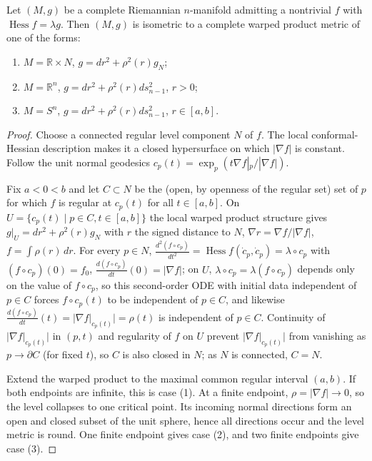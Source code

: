 \begin{theorem}
  \label{thm:pet-ch5-tashiro}

  Let $(M,g)$ be a complete Riemannian $n$-manifold admitting a nontrivial $f$
  with $\operatorname{Hess}f=\lambda g$. Then $(M,g)$ is isometric to a complete
  warped product metric of one of the forms:
  \begin{enumerate}
  \item[(1)] $M=\mathbb R\times N$, $g=dr^2+\rho^2(r)g_N$;
  \item[(2)] $M=\mathbb R^n$, $g=dr^2+\rho^2(r)ds_{n-1}^2$, $r>0$;
  \item[(3)] $M=S^n$, $g=dr^2+\rho^2(r)ds_{n-1}^2$, $r\in[a,b]$.
  \end{enumerate}
\end{theorem}
\begin{proof}
  \sketch
  Choose a connected regular level component $N$ of $f$.  The local
  conformal-Hessian description makes it a closed hypersurface on which
  $|\nabla f|$ is constant.  Follow the unit normal geodesics
  $c_p(t)=\exp_p(t\nabla f|_p/|\nabla f|)$.

  Fix $a<0<b$ and let $C\subset N$ be the (open, by openness of the regular set) set
  of $p$ for which $f$ is regular at $c_p(t)$ for all $t\in[a,b]$. On
  $U=\{c_p(t)\mid p\in C,t\in[a,b]\}$ the local warped product structure gives
  $g|_U=dr^2+\rho^2(r)g_N$ with $r$ the signed distance to $N$,
  $\nabla r=\nabla f/|\nabla f|$, $f=\int\rho(r)\,dr$. For every $p\in N$,
  $\frac{d^2(f\circ c_p)}{dt^2}=\operatorname{Hess}f(\dot c_p,\dot c_p)=\lambda\circ c_p$
  with $(f\circ c_p)(0)=f_0$, $\frac{d(f\circ c_p)}{dt}(0)=|\nabla f|$; on $U$,
  $\lambda\circ c_p=\lambda(f\circ c_p)$ depends only on the value of
  $f\circ c_p$, so this second-order ODE with initial data independent of
  $p\in C$ forces $f\circ c_p(t)$ to be independent of $p\in C$, and likewise
  $\frac{d(f\circ c_p)}{dt}(t)=|\nabla f|_{c_p(t)}|=\rho(t)$ is independent of
  $p\in C$. Continuity of $|\nabla f|_{c_p(t)}|$ in $(p,t)$ and regularity of $f$
  on $U$ prevent $|\nabla f|_{c_p(t)}|$ from vanishing as $p\to\partial C$ (for
  fixed $t$), so $C$ is also closed in $N$; as $N$ is connected, $C=N$.

  Extend the warped product to the maximal common regular interval $(a,b)$.  If
  both endpoints are infinite, this is case (1).  At a finite endpoint,
  $\rho=|\nabla f|\to0$, so the level collapses to one critical point.  Its incoming
  normal directions form an open and closed subset of the unit sphere, hence all
  directions occur and the level metric is round.  One finite endpoint gives case
  (2), and two finite endpoints give case (3).
\end{proof}

